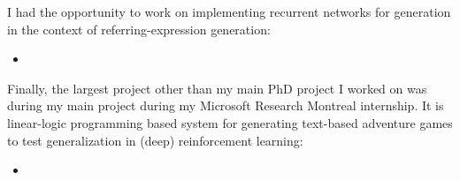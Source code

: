 I had the opportunity to work on implementing recurrent networks for
generation in the context of referring-expression generation:

\begin{itemize}
\item {}
\end{itemize}

Finally, the largest project other than my main PhD project I worked
on was during my main project during my Microsoft Research Montreal internship.
It is linear-logic programming based system for 
generating text-based adventure games to test
generalization in (deep) reinforcement learning:

\begin{itemize}
\item {}
\end{itemize}





